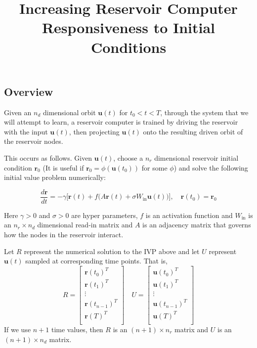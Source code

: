 \documentclass{article}
\begin{document}
\title{Increasing Reservoir Computer Responsiveness to Initial Conditions}
\maketitle

\subsection*{Overview}

Given an $n_d$ dimensional orbit $\mathbf{u}(t)$ for $t_0 < t < T$, through the system that we will attempt to learn, a reservoir computer is trained by driving the reservoir with the input $\mathbf{u}(t)$, then projecting $\mathbf{u}(t)$ onto the resulting driven orbit of the reservoir nodes. 

This occurs as follows. Given $\mathbf{u}(t)$, choose a $n_r$ dimensional reservoir initial condition $\mathbf{r}_0$ (It is useful if $\mathbf{r}_0 = \phi(\mathbf{u}(t_0))$ for some $\phi$) and solve the following initial value problem numerically:

\begin{equation} \label{untrained}
\frac{d\mathbf{r}}{dt} = -\gamma\big[\mathbf{r}(t) + f\big(A\mathbf{r}(t) + \sigma W_\text{in} \mathbf{u}(t)\big)\big], \quad
\mathbf{r}(t_0) = \mathbf{r}_0
\end{equation}

Here $\gamma > 0$ and $\sigma > 0$ are hyper parameters, $f$ is an activation function and $W_\text{in}$ is an $n_r \times n_d$ dimensional read-in matrix and  $A$ is an adjacency matrix that governs how the nodes in the reservoir interact. 

Let $R$ represent the numerical solution to the IVP above and let $U$ represent $\mathbf{u}(t)$ sampled at corresponding time points. That is,
\[
R =
\begin{bmatrix}
\mathbf{r}(t_0)^T \\
\mathbf{r}(t_1)^T \\
\vdots \\
\mathbf{r}(t_{n-1})^T \\
\mathbf{r}(T)^T \\
\end{bmatrix}
\quad 
U =
\begin{bmatrix}
\mathbf{u}(t_0)^T \\
\mathbf{u}(t_1)^T \\
\vdots \\
\mathbf{u}(t_{n-1})^T \\
\mathbf{u}(T)^T \\
\end{bmatrix}
\]
If we use $n+1$ time values, then $R$ is an $(n+1)\times n_r$ matrix and $U$ is an $(n+1)\times n_d$ matrix.
\end{document}
